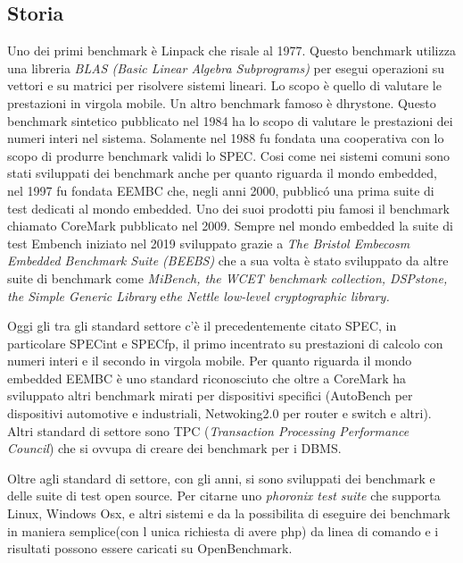 \documentclass[12pt,a4paper]{report}
\begin{document}
\subsection{Storia}
    Uno dei primi benchmark è Linpack che risale al 1977. Questo benchmark utilizza una libreria \textit{BLAS (Basic Linear Algebra Subprograms) } per esegui operazioni su vettori e su matrici per risolvere sistemi lineari. Lo scopo è quello di valutare le prestazioni in virgola mobile. \cite{LinpackSite}
    Un altro benchmark famoso è dhrystone. Questo benchmark sintetico pubblicato nel 1984 ha lo scopo di valutare le prestazioni dei numeri interi nel sistema.\cite{DhrystoneWP} 
    Solamente nel 1988 fu fondata una cooperativa con lo scopo di produrre benchmark validi lo SPEC.\cite{SPECSite}%
    Cosi come nei sistemi comuni sono stati sviluppati dei benchmark anche per quanto riguarda il mondo embedded, nel 1997 fu fondata EEMBC che, negli anni 2000, pubblicó una prima suite di test dedicati al mondo embedded. \cite{EEMBCSite}
    Uno dei suoi prodotti piu famosi il benchmark chiamato CoreMark pubblicato nel 2009. %
    Sempre nel mondo embedded la suite di test Embench iniziato nel 2019 \cite{embenchSite}
    sviluppato grazie a \textit{The Bristol Embecosm Embedded Benchmark Suite (BEEBS)} che a sua volta è stato sviluppato da altre suite di benchmark come \textit{MiBench, the WCET benchmark collection, DSPstone, the Simple Generic Library} e\textit{the Nettle low-level cryptographic library.}\cite{NettleSite}\cite{vittekBorovanskyMoreauTurin2006,}\cite{DSPStoneSite} \cite{WCETSite} \cite{MiBenchSite}
    
    Oggi gli tra gli standard settore c'è il precedentemente citato SPEC, in particolare SPECint e SPECfp, il primo incentrato su prestazioni di calcolo con numeri interi e il secondo in virgola mobile.  
    Per quanto riguarda il mondo embedded EEMBC è uno standard riconosciuto che oltre a CoreMark ha sviluppato altri benchmark mirati per dispositivi specifici (AutoBench per dispositivi automotive e industriali, Netwoking2.0  per router e switch e altri). %
    Altri standard di settore sono TPC (\textit{Transaction Processing Performance Council}) che si ovvupa di creare dei benchmark per i DBMS. \cite{TPCSite}

    Oltre agli standard di settore, con gli anni, si sono sviluppati dei benchmark e delle suite di test open source. Per citarne uno \textit{phoronix test suite}    \cite{ PhoronixTestSuiteSite}
    che supporta Linux, Windows Osx, e altri sistemi e da la possibilita di eseguire dei benchmark in maniera semplice(con l unica richiesta di avere php) da linea di comando e i risultati possono essere caricati su OpenBenchmark. \cite{OpenBenchmarkSite}
\end{document}
